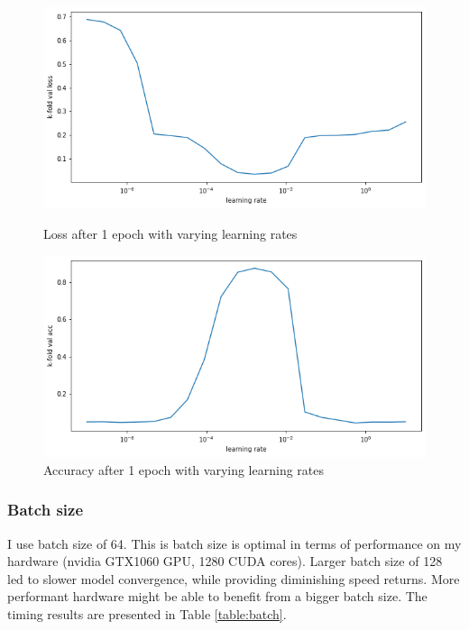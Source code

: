 \documentclass[journal,12pt,onecolumn]{IEEEtran}
\begin{document}
\begin{figure}[!tbp]
  \centering
  \begin{minipage}[b]{0.45\textwidth}
    \includegraphics[width=\textwidth]{loss_nn.png}
    \caption{Loss after 1 epoch with varying learning rates}
    \label{fig:loss}
  \end{minipage}
  \hfill
  \begin{minipage}[b]{0.45\textwidth}
    \includegraphics[width=\textwidth]{accuracy_nn.png}
    \caption{Accuracy after 1 epoch with varying learning rates}
    \label{fig:acc}
  \end{minipage}
\end{figure}


\subsubsection{Batch size} I use batch size of 64. This is batch size is optimal in terms of performance on my hardware (nvidia GTX1060 GPU, 1280 CUDA cores). Larger batch size of 128 led to slower model convergence, while providing diminishing speed returns. More performant hardware might be able to benefit from a bigger batch size. The timing results are presented in Table \ref{table:batch}.
 
\end{document}
